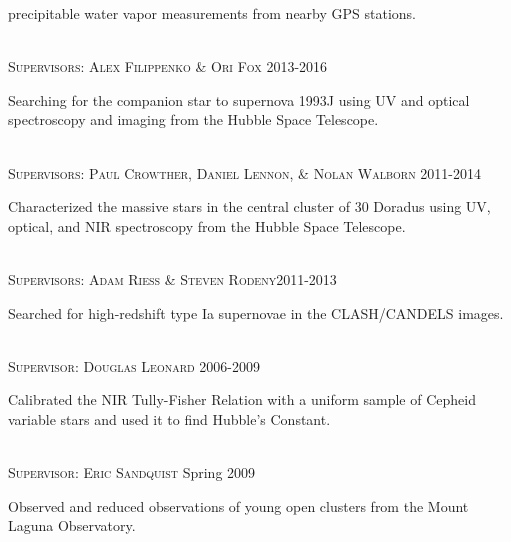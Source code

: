 \documentclass[10pt]{cv}
\begin{document}
\begin{llist}
\begin{minipage}[l]{0.7\textwidth}
precipitable water vapor measurements from nearby GPS stations.\\
\end{minipage}
\\
\textsc{Supervisors: Alex Filippenko \& Ori Fox} \hfill 2013-2016\\
\begin{minipage}[l]{0.7\textwidth}\vspace{0.15cm}
Searching for the companion star to supernova 1993J using UV and optical 
spectroscopy and imaging from the Hubble Space Telescope.\\
\end{minipage}
\\
\textsc{Supervisors: Paul Crowther, Daniel Lennon, \& Nolan Walborn} \hfill 2011-2014\\
\begin{minipage}[l]{0.7\textwidth}\vspace{0.15cm}
Characterized the massive stars in the central cluster of 30 Doradus using 
UV, optical, and NIR spectroscopy from the Hubble Space Telescope.\\
\end{minipage}
\\
\textsc{Supervisors: Adam Riess \& Steven Rodeny}\hfill 2011-2013\\
\begin{minipage}[l]{0.7\textwidth}\vspace{0.15cm}
Searched for high-redshift type Ia supernovae in the CLASH/CANDELS images.\\
\end{minipage}
\\
\textsc{Supervisor: Douglas Leonard} \hfill 2006-2009 \\
\begin{minipage}[l]{0.7\textwidth}\vspace{0.15cm}
Calibrated the NIR Tully-Fisher Relation with a uniform sample of Cepheid variable stars and used it to find Hubble's Constant.\\
\end{minipage}
\\
\textsc{Supervisor: Eric Sandquist} \hfill Spring 2009\\
\begin{minipage}[l]{0.7\textwidth}\vspace{0.15cm}
Observed and reduced observations of young open clusters from the Mount Laguna Observatory. \\ 
\end{minipage}

\end{llist}
\end{document}
